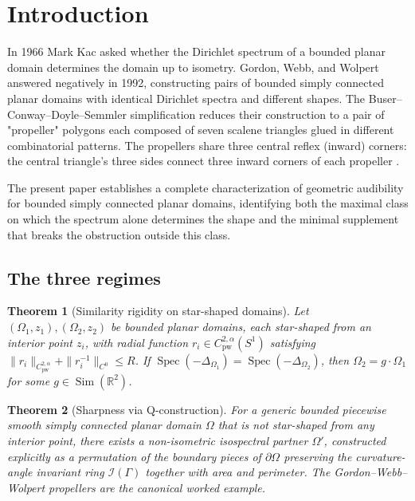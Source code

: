 \documentclass[11pt,reqno]{amsart}
\theoremstyle{plain}
\newtheorem{theorem}{Theorem}[section]
\theoremstyle{definition}
\theoremstyle{remark}
\DeclareMathOperator{\Spec}{Spec}
\DeclareMathOperator{\Sim}{Sim}
\newcommand{\Reals}{\mathbb{R}}
\newcommand{\Icalbb}{\mathcal{I}}
\begin{document}
\maketitle

\tableofcontents

\section{Introduction}\label{sec:intro}

In 1966 Mark Kac \cite{Kac} asked whether the Dirichlet spectrum of a bounded planar domain determines the domain up to isometry. Gordon, Webb, and Wolpert \cite{GWW} answered negatively in 1992, constructing pairs of bounded simply connected planar domains with identical Dirichlet spectra and different shapes. The Buser--Conway--Doyle--Semmler simplification \cite{BCDS} reduces their construction to a pair of "propeller" polygons each composed of seven scalene triangles glued in different combinatorial patterns. The propellers share three central reflex (inward) corners: the central triangle's three sides connect three inward corners of each propeller \cite[\S 2]{BCDS}.

The present paper establishes a complete characterization of geometric audibility for bounded simply connected planar domains, identifying both the maximal class on which the spectrum alone determines the shape and the minimal supplement that breaks the obstruction outside this class.

\subsection{The three regimes}\label{ss:three-regimes}

\begin{theorem}[Similarity rigidity on star-shaped domains]\label{thm:A}
Let $(\Omega_1, z_1), (\Omega_2, z_2)$ be bounded planar domains, each star-shaped from an interior point $z_i$, with radial function $r_i \in C^{2,\alpha}_{\mathrm{pw}}(S^1)$ satisfying $\|r_i\|_{C^{2,\alpha}_{\mathrm{pw}}} + \|r_i^{-1}\|_{C^0} \leq R$. If $\Spec(-\Delta_{\Omega_1}) = \Spec(-\Delta_{\Omega_2})$, then $\Omega_2 = g\cdot\Omega_1$ for some $g \in \Sim(\Reals^2)$.
\end{theorem}

\begin{theorem}[Sharpness via Q-construction]\label{thm:B}
For a generic bounded piecewise smooth simply connected planar domain $\Omega$ that is not star-shaped from any interior point, there exists a non-isometric isospectral partner $\Omega'$, constructed explicitly as a permutation of the boundary pieces of $\partial\Omega$ preserving the curvature-angle invariant ring $\Icalbb(\Gamma)$ together with area and perimeter. The Gordon--Webb--Wolpert propellers are the canonical worked example.
\end{theorem}
\end{document}
